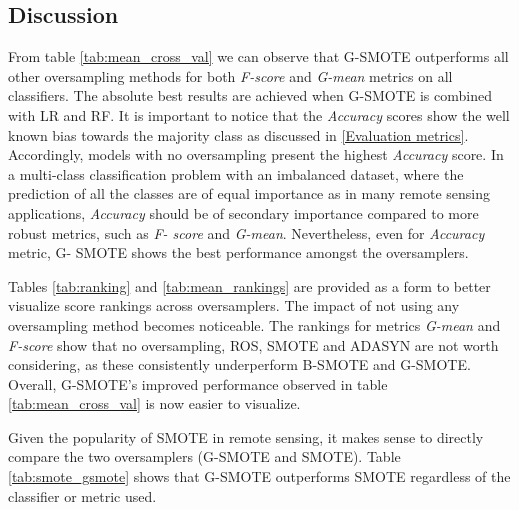 \documentclass[remotesensing,article,submit,moreauthors,pdftex]{Definitions/mdpi}
\begin{document}
\subsection{Discussion}

From table \ref{tab:mean_cross_val} we can observe that G-SMOTE outperforms all
other oversampling methods for both \textit{F-score} and \textit{G-mean} metrics
on all classifiers. The absolute best results are achieved when G-SMOTE is
combined with LR and RF. It is important to notice that the \textit{Accuracy}
scores show the well known bias towards the majority class as discussed in
\ref{Evaluation metrics}. Accordingly, models with no oversampling present the
highest \textit{Accuracy} score. In a multi-class classification problem with an
imbalanced dataset, where the prediction of all the classes are of equal
importance as in many remote sensing applications, \textit{Accuracy} should be
of secondary importance compared to more robust metrics, such as \textit{F-
score} and \textit{G-mean}. Nevertheless, even for \textit{Accuracy} metric, G-
SMOTE shows the best performance amongst the oversamplers.

Tables \ref{tab:ranking} and \ref{tab:mean_rankings} are provided as a form to
better visualize score rankings across oversamplers. The impact of not using any
oversampling method becomes noticeable. The rankings for metrics \textit{G-mean}
and \textit{F-score} show that no oversampling, ROS, SMOTE and ADASYN are not
worth considering, as these consistently underperform B-SMOTE and G-SMOTE.
Overall, G-SMOTE's improved performance observed in table
\ref{tab:mean_cross_val} is now easier to visualize.

Given the popularity of SMOTE in remote sensing, it makes sense to directly
compare the two oversamplers (G-SMOTE and SMOTE). Table \ref{tab:smote_gsmote}
shows that G-SMOTE outperforms SMOTE regardless of the classifier or metric
used.
\end{document}
